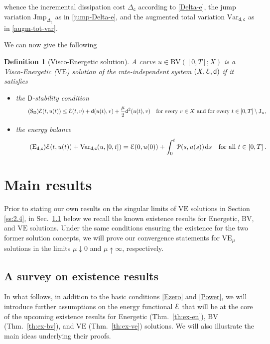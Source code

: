 \documentclass[a4paper,10pt,reqno]{amsart} %
\newtheorem{definition}[theorem]{Definition}
\numberwithin{equation}{section}
\newcommand{\up}{\uparrow}
\newcommand{\down}{\downarrow}
\def\dd{\;\!\mathrm{d}} %
\newcommand{\Xs}{X}
\newcommand{\BV}{\mathrm{BV}}
\newcommand{\mdn}{\mathsf{d}}
\newcommand{\md}[2]{\mathsf{d}(#1,#2)}
\newcommand{\ene}[2]{\mathcal{E}(#1,#2)}
\newcommand{\pw}[2]{\mathcal{P}(#1,#2)}
\newcommand{\cmdn}{\mathsf{D}}
\newcommand{\Vari}[4]{\mathrm{Var}_{#1}(#2,[#3,#4])}
\newcommand{\Varname}[1]{\mathrm{Var}_{#1}}
\newcommand{\jump}[1]{\mathrm{J}_{#1}}
\newcommand{\vecostname}{\mathsf{c}}
\newcommand{\RIS}{(\Xs,\calE,\mdn)}
\newcommand{\VE}{\mathrm{VE}}
\newcommand{\VEa}[1]{\mathrm{VE}_{#1}}
\newcommand{\RRR}{\color{red}}
\newcommand{\EEE}{\color{black}}
\begin{document}
whence the incremental dissipation cost $\Delta_{\vecostname}$ according to   \eqref{Delta-e}, the jump variation $\mathrm{Jmp}_{\Delta_{\vecostname}}$ as in  \eqref{jump-Delta-e}, and the  augmented total variation $\Varname{\mdn,\vecostname}$ as in  \eqref{augm-tot-var}. 
\par
We can now give the following
\begin{definition}[Visco-Energetic solution]
A curve $u\in \BV([0,T];X)$ is  a Visco-Energetic ($\VE$) solution of the rate-independent system $\RIS$
if it satisfies
\begin{itemize}
\item[-] the $\cmdn$-stability condition
\begin{equation}
\label{stab-VE}
\tag{$\mathrm{S}_{\cmdn}$}
\ene t{u(t)} \leq \ene tv + \md{u(t)}v + \frac\mu2 \mdn^2 (u(t),v)   \quad \text{for every } v \in \Xs \text{ and for every } t \in [0,T]\setminus \jump u,
\end{equation}
\item[-]  the energy balance
\begin{equation}
\label{enbal-VE}
\tag{$\mathrm{E}_{\mdn,\vecostname}$}
\ene t{u(t)} + \Vari {\mdn,\vecostname}{u}0{t} = \ene 0{u(0)} +\int_0^t \pw s{u(s)} \dd s \quad \text{for all } t \in [0,T]\,.
\end{equation}
\end{itemize}
\end{definition}
\section{Main results}
\label{s:main-results}
Prior to stating our own results on the singular limits of $\VE$ solutions in Section \ref{ss:2.4}, 
in Sec.\ \ref{ss:2.3} below 
we recall the known existence results for Energetic,  $\BV$,   and $\VE$ solutions. Under the same conditions ensuring the existence for the two former solution concepts, we will prove our convergence statements 
for $\VEa{\mu}$ solutions 
 in the limits $\mu\down0$ and $\mu\up\infty$, respectively. 
\subsection{A survey on existence  results}
\label{ss:2.3}
In what follows, in addition to the basic conditions   \eqref{Ezero}  and  \eqref{Power},  we will introduce further assumptions 
on the energy functional ${\mathcal E}$
that will be at the core of the upcoming existence results for  Energetic (Thm.\ \ref{th:ex-en}), $\BV$ (Thm.\ \ref{th:ex-bv}), and $\VE$ (Thm.\ \ref{th:ex-ve}) solutions. We will also 
illustrate the main ideas underlying their proofs.
\end{document}
